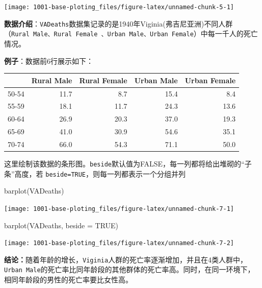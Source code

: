 \documentclass[
]{book}
\newenvironment{Shaded}{\begin{snugshade}}{\end{snugshade}}
\newcommand{\AttributeTok}[1]{\textcolor[rgb]{0.77,0.63,0.00}{#1}}
\newcommand{\ConstantTok}[1]{\textcolor[rgb]{0.00,0.00,0.00}{#1}}
\newcommand{\FunctionTok}[1]{\textcolor[rgb]{0.00,0.00,0.00}{#1}}
\newcommand{\NormalTok}[1]{#1}
\begin{document}
\begin{center}\texttt{[image: 1001-base-ploting\_files/figure-latex/unnamed-chunk-5-1]} \end{center}

\textbf{数据介绍}：\texttt{VADeaths}数据集记录的是1940年Viginia(弗吉尼亚洲)不同人群（\texttt{Rural\ Male、Rural\ Female\ 、Urban\ Male、Urban\ Female}）中每一千人的死亡情况。

\textbf{例子}：数据前6行展示如下：

\begin{tabular}{l|r|r|r|r}
\hline
  & Rural Male & Rural Female & Urban Male & Urban Female\\
\hline
50-54 & 11.7 & 8.7 & 15.4 & 8.4\\
\hline
55-59 & 18.1 & 11.7 & 24.3 & 13.6\\
\hline
60-64 & 26.9 & 20.3 & 37.0 & 19.3\\
\hline
65-69 & 41.0 & 30.9 & 54.6 & 35.1\\
\hline
70-74 & 66.0 & 54.3 & 71.1 & 50.0\\
\hline
\end{tabular}

这里绘制该数据的条形图。\texttt{beside}默认值为FALSE，每一列都将给出堆砌的``子条''高度，若 \texttt{beside=TRUE}，则每一列都表示一个分组并列

\begin{Shaded}
\begin{Highlighting}[]
\FunctionTok{barplot}\NormalTok{(VADeaths)  }
\end{Highlighting}
\end{Shaded}

\begin{center}\texttt{[image: 1001-base-ploting\_files/figure-latex/unnamed-chunk-7-1]} \end{center}

\begin{Shaded}
\begin{Highlighting}[]
\FunctionTok{barplot}\NormalTok{(VADeaths, }\AttributeTok{beside =} \ConstantTok{TRUE}\NormalTok{)}
\end{Highlighting}
\end{Shaded}

\begin{center}\texttt{[image: 1001-base-ploting\_files/figure-latex/unnamed-chunk-7-2]} \end{center}

\textbf{结论：}随着年龄的增长，\texttt{Viginia}人群的死亡率逐渐增加，并且在4类人群中， \texttt{Urban\ Male}的死亡率比同年龄段的其他群体的死亡率高。同时，在同一环境下，相同年龄段的男性的死亡率要比女性高。
\end{document}
